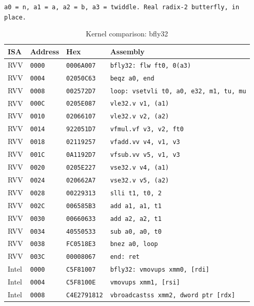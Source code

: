 \begin{table}[htbp]
\centering
\caption{Kernel comparison: bfly32}
\begingroup
\scriptsize
\setlength{\tabcolsep}{4pt}
\noindent \texttt{a0 = n, a1 = a, a2 = b, a3 = twiddle. Real radix-2 butterfly, in place.}\par
\vspace{0.6ex}
\begin{tabular}{@{}l|l|l|p{7.2cm}@{}}
\toprule
ISA & Address & Hex & Assembly \\
\midrule
RVV & \texttt{0000} & \texttt{0006A007} & \texttt{bfly32: flw ft0, 0(a3)} \\
RVV & \texttt{0004} & \texttt{02050C63} & \texttt{beqz a0, end} \\
RVV & \texttt{0008} & \texttt{002572D7} & \texttt{loop: vsetvli t0, a0, e32, m1, tu, mu} \\
RVV & \texttt{000C} & \texttt{0205E087} & \texttt{vle32.v v1, (a1)} \\
RVV & \texttt{0010} & \texttt{02066107} & \texttt{vle32.v v2, (a2)} \\
RVV & \texttt{0014} & \texttt{922051D7} & \texttt{vfmul.vf v3, v2, ft0} \\
RVV & \texttt{0018} & \texttt{02119257} & \texttt{vfadd.vv v4, v1, v3} \\
RVV & \texttt{001C} & \texttt{0A1192D7} & \texttt{vfsub.vv v5, v1, v3} \\
RVV & \texttt{0020} & \texttt{0205E227} & \texttt{vse32.v v4, (a1)} \\
RVV & \texttt{0024} & \texttt{020662A7} & \texttt{vse32.v v5, (a2)} \\
RVV & \texttt{0028} & \texttt{00229313} & \texttt{slli t1, t0, 2} \\
RVV & \texttt{002C} & \texttt{006585B3} & \texttt{add a1, a1, t1} \\
RVV & \texttt{0030} & \texttt{00660633} & \texttt{add a2, a2, t1} \\
RVV & \texttt{0034} & \texttt{40550533} & \texttt{sub a0, a0, t0} \\
RVV & \texttt{0038} & \texttt{FC0518E3} & \texttt{bnez a0, loop} \\
RVV & \texttt{003C} & \texttt{00008067} & \texttt{end: ret} \\
\midrule
Intel & \texttt{0000} & \texttt{C5F81007} & \texttt{bfly32: vmovups xmm0, [rdi]} \\
Intel & \texttt{0004} & \texttt{C5F8100E} & \texttt{vmovups xmm1, [rsi]} \\
Intel & \texttt{0008} & \texttt{C4E2791812} & \texttt{vbroadcastss xmm2, dword ptr [rdx]} \\

\end{tabular}
\end{table}

